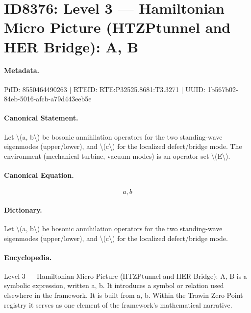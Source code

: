 \section*{ID8376: Level 3 — Hamiltonian Micro Picture (HTZPtunnel and HER Bridge): A, B}
\paragraph{Metadata.}
PiID: 8550464490263 | RTEID: RTE:P32525.8681:T3.3271 | UUID: 1b567b02-84eb-5016-afcb-a79d443eeb5e

\paragraph{Canonical Statement.}
Let \textbackslash{}(a, b\textbackslash{}) be bosonic annihilation operators for the two standing-wave eigenmodes (upper/lower), and \textbackslash{}(c\textbackslash{}) for the localized defect/bridge mode. The environment (mechanical turbine, vacuum modes) is an operator set \textbackslash{}(E\textbackslash{}).

\paragraph{Canonical Equation.}
\[
a, b
\]

\paragraph{Dictionary.}
Let \textbackslash{}(a, b\textbackslash{}) be bosonic annihilation operators for the two standing-wave eigenmodes (upper/lower), and \textbackslash{}(c\textbackslash{}) for the localized defect/bridge mode.

\paragraph{Encyclopedia.}
Level 3 — Hamiltonian Micro Picture (HTZPtunnel and HER Bridge): A, B is a symbolic expression, written a, b. It introduces a symbol or relation used elsewhere in the framework. It is built from a, b. Within the Trawin Zero Point registry it serves as one element of the framework's mathematical narrative.
